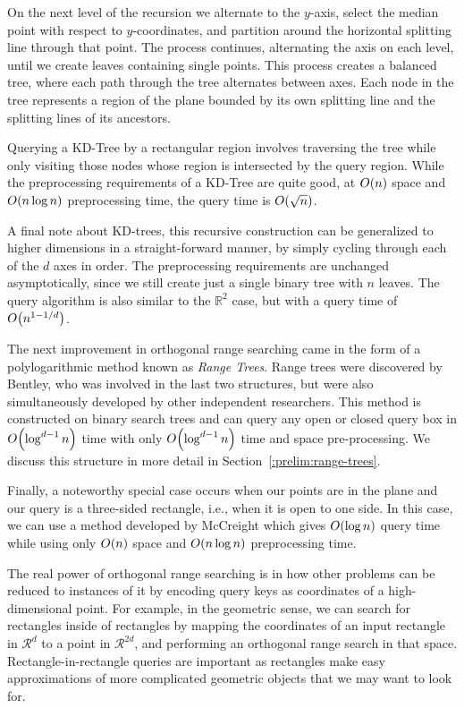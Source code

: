 On the next level of the recursion we alternate to the $y$-axis, select the median point with respect to $y$-coordinates, and partition around the horizontal splitting line through that point.
The process continues, alternating the axis on each level, until we create leaves containing single points.
This process creates a balanced tree, where each path through the tree alternates between axes.
Each node in the tree represents a region of the plane bounded by its own splitting line and the splitting lines of its ancestors.

Querying a KD-Tree by a rectangular region involves traversing the tree while only visiting those nodes whose region is intersected by the query region.
While the preprocessing requirements of a KD-Tree are quite good, at $O\!\left(n\right)$ space and $O\!\left(n\log{n}\right)$ preprocessing time, the query time is $O\!\left(\sqrt{n}\right)$.

A final note about KD-trees, this recursive construction can be generalized to higher dimensions in a straight-forward manner, by simply cycling through each of the $d$ axes in order.
The preprocessing requirements are unchanged asymptotically, since we still create just a single binary tree with $n$ leaves.
The query algorithm is also similar to the $\mathbb{R}^2$ case, but with a query time of $O\!\left(n^{1-1/d}\right)$.

The next improvement in orthogonal range searching came in the form of a polylogarithmic method known as \emph{Range Trees}. 
Range trees were discovered by Bentley\cite{Bentley79}, who was involved in the last two structures, but were also simultaneously developed by other independent researchers.
This method is constructed on binary search trees and can query any open or closed query box in $O\!\left(\log^{d-1}{n}\right)$ time with only $O\!\left(\log^{d-1}{n}\right)$ time and space pre-processing.
We discuss this structure in more detail in Section~\ref{:prelim:range-trees}.


Finally, a noteworthy special case occurs when our points are in the plane and our query is a three-sided rectangle, i.e., when it is open to one side.
In this case, we can use a method developed by McCreight\cite{McCreight85} which gives $O\!\left(\log{n}\right)$ query time while using only $O\!\left(n\right)$ space and $O\!\left(n\log{n}\right)$ preprocessing time.

The real power of orthogonal range searching is in how other problems can be reduced to instances of it by encoding query keys as coordinates of a high-dimensional point.  
For example, in the geometric sense, we can search for rectangles inside of rectangles by mapping the coordinates of an input rectangle in $\mathcal{R}^{d}$ to a point in $\mathcal{R}^{2d}$, and performing an orthogonal range search in that space.
Rectangle-in-rectangle queries are important as rectangles make easy approximations of more complicated geometric objects that we may want to look for.

